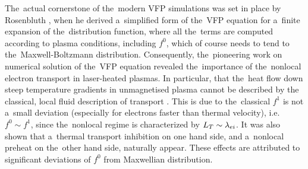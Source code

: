 
The~actual cornerstone of the~modern VFP simulations was set in place
by Rosenbluth \cite{Rosenbluth_PR1957}, when he derived a~simplified form 
of the~VFP equation for a~finite expansion of the~distribution function,
where all the~terms are computed according to plasma conditions, including
$f^0$, which of course needs to tend to the~Maxwell-Boltzmann distribution.
Consequently, the~pioneering work on numerical solution of the~VFP equation
\cite{Bell_1981_83, Matte_1982_86} revealed the~importance of the~nonlocal
electron transport in laser-heated plasmas. 
In particular, that the~heat flow down steep temperature gradients in 
unmagnetised plasma cannot be described by the classical, local fluid
description of transport \cite{SpitzerHarm_PR1953, Braginskii_1965_3}.
This is due to the~classical $f^1$ is not a~small deviation 
(especially for electrons faster than thermal velocity), i.e. $f^0\sim f^1$,
since the~nonlocal regime is characterized by $L_T\sim\lambda_{ei}$.
It was also shown that a~thermal transport inhibition \cite{Bell_1981_83} 
on one hand side, and a~nonlocal preheat on the~other hand side, 
naturally appear. These effects are attributed to significant deviations 
of $f^0$ from Maxwellian distribution.



